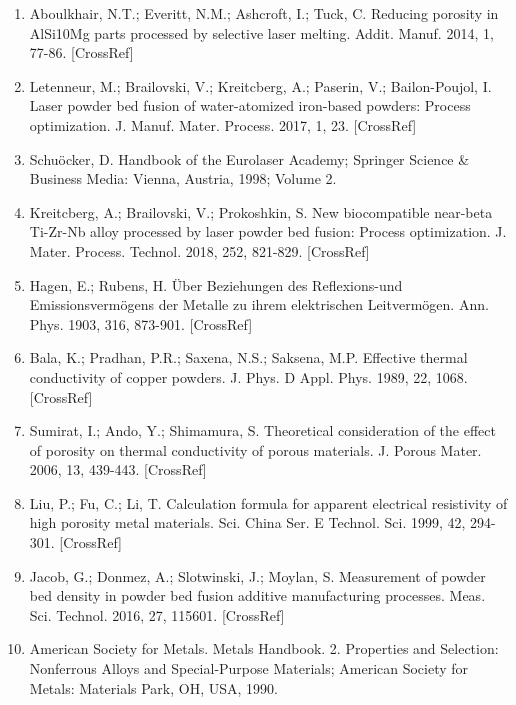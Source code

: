 \documentclass[10pt]{article}
\begin{document}
\begin{enumerate}
  \item Aboulkhair, N.T.; Everitt, N.M.; Ashcroft, I.; Tuck, C. Reducing porosity in AlSi10Mg parts processed by selective laser melting. Addit. Manuf. 2014, 1, 77-86. [CrossRef]

  \item Letenneur, M.; Brailovski, V.; Kreitcberg, A.; Paserin, V.; Bailon-Poujol, I. Laser powder bed fusion of water-atomized iron-based powders: Process optimization. J. Manuf. Mater. Process. 2017, 1, 23. [CrossRef]

  \item Schuöcker, D. Handbook of the Eurolaser Academy; Springer Science \& Business Media: Vienna, Austria, 1998; Volume 2.

  \item Kreitcberg, A.; Brailovski, V.; Prokoshkin, S. New biocompatible near-beta Ti-Zr-Nb alloy processed by laser powder bed fusion: Process optimization. J. Mater. Process. Technol. 2018, 252, 821-829. [CrossRef]

  \item Hagen, E.; Rubens, H. Über Beziehungen des Reflexions-und Emissionsvermögens der Metalle zu ihrem elektrischen Leitvermögen. Ann. Phys. 1903, 316, 873-901. [CrossRef]

  \item Bala, K.; Pradhan, P.R.; Saxena, N.S.; Saksena, M.P. Effective thermal conductivity of copper powders. J. Phys. D Appl. Phys. 1989, 22, 1068. [CrossRef]

  \item Sumirat, I.; Ando, Y.; Shimamura, S. Theoretical consideration of the effect of porosity on thermal conductivity of porous materials. J. Porous Mater. 2006, 13, 439-443. [CrossRef]

  \item Liu, P.; Fu, C.; Li, T. Calculation formula for apparent electrical resistivity of high porosity metal materials. Sci. China Ser. E Technol. Sci. 1999, 42, 294-301. [CrossRef]

  \item Jacob, G.; Donmez, A.; Slotwinski, J.; Moylan, S. Measurement of powder bed density in powder bed fusion additive manufacturing processes. Meas. Sci. Technol. 2016, 27, 115601. [CrossRef]

  \item American Society for Metals. Metals Handbook. 2. Properties and Selection: Nonferrous Alloys and Special-Purpose Materials; American Society for Metals: Materials Park, OH, USA, 1990.


\end{enumerate}
\end{document}
